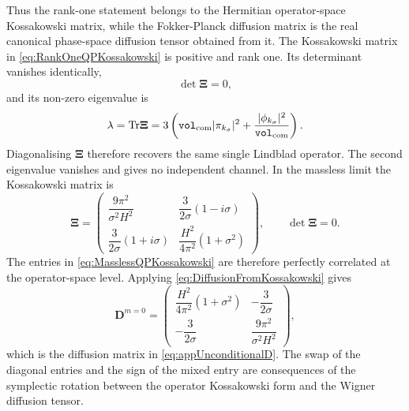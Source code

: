 \documentclass{article}
\def\Tr{\mathrm{Tr}}
\newcommand{\VF}{\mathtt{vol}_{\rm com}}
\numberwithin{equation}{section}
\begin{document}
	Thus the rank-one statement belongs to the Hermitian operator-space Kossakowski matrix, while the Fokker-Planck diffusion matrix is the real canonical phase-space diffusion tensor obtained from it. The Kossakowski matrix in \cref{eq:RankOneQPKossakowski} is positive and rank one. Its determinant vanishes identically,
	\begin{equation}
		\det\bm\Xi=0,
	\end{equation}
	and its non-zero eigenvalue is
	\begin{equation}
		\lambda=\Tr\bm\Xi =3\left(\VF|\pi_{k_\sigma}|^2+\frac{|\phi_{k_\sigma}|^2}{\VF}\right).
	\end{equation}
	Diagonalising \(\bm\Xi\) therefore recovers the same single Lindblad operator. The second eigenvalue vanishes and gives no independent channel. In the massless limit the Kossakowski matrix is
	\begin{equation}
		\bm\Xi=
		\begin{pmatrix}
			\dfrac{9\pi^2}{\sigma^2H^2} & \dfrac{3}{2\sigma}(1-i\sigma) \\[8pt] \dfrac{3}{2\sigma}(1+i\sigma) & \dfrac{H^2}{4\pi^2}(1+\sigma^2)
		\end{pmatrix},
		\qquad \det\bm\Xi=0.
		\label{eq:MasslessQPKossakowski}
	\end{equation}
	The entries in \cref{eq:MasslessQPKossakowski} are therefore perfectly correlated at the operator-space level. Applying \cref{eq:DiffusionFromKossakowski} gives
	\begin{equation}
		\bm D^{m=0} =
		\begin{pmatrix}
			\dfrac{H^2}{4\pi^2}(1+\sigma^2) & -\dfrac{3}{2\sigma} \\[8pt] -\dfrac{3}{2\sigma} & \dfrac{9\pi^2}{\sigma^2H^2}
		\end{pmatrix},
	\end{equation}
	which is the diffusion matrix in \cref{eq:appUnconditionalD}. The swap of the diagonal entries and the sign of the mixed entry are consequences of the symplectic rotation between the operator Kossakowski form and the Wigner diffusion tensor.
\end{document}
